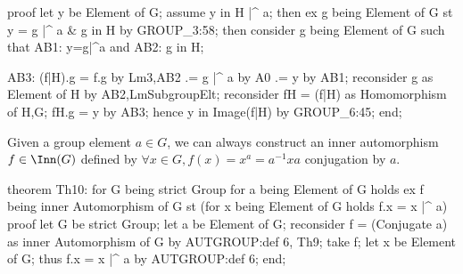 \nwendcode{}\nwdocspar


\nwenddocs{}\endmoddef\nwstartdeflinemarkup{}\nwenddeflinemarkup
proof
  let y be Element of G;
  assume y in H |^ a;
  then ex g being Element of G st y = g |^ a & g in H by GROUP_3:58;
  then consider g being Element of G such that
  AB1:    y=g|^a and
  AB2:    g in H;
    
AB3:  (f|H).g = f.g by Lm3,AB2
      .= g |^ a by A0
      .= y by AB1;
  reconsider g as Element of H by AB2,LmSubgroupElt;
  reconsider fH = (f|H) as Homomorphism of H,G;
  fH.g = y by AB3;
  hence y in Image(f|H) by GROUP_6:45;
end;

\nwendcode{}\nwdocspar

 Given a group element $a\in G$, we can always construct an
inner automorphism $f\in\Inn(G)$ defined by
$\forall x\in G,f(x)=x^{a}=a^{-1}xa$ conjugation by $a$.

\nwenddocs{}\endmoddef\nwstartdeflinemarkup{}\nwenddeflinemarkup
theorem Th10:
  for G being strict Group
  for a being Element of G
  holds ex f being inner Automorphism of G st (for x being Element of G
  holds f.x = x |^ a)
proof
  let G be strict Group;
  let a be Element of G;
  reconsider f = (Conjugate a) as inner Automorphism of G
  by AUTGROUP:def 6, Th9;
  take f;
  let x be Element of G;
  thus f.x = x |^ a by AUTGROUP:def 6;
end;

\nwendcode{}\nwdocspar

\nwenddocs{}

